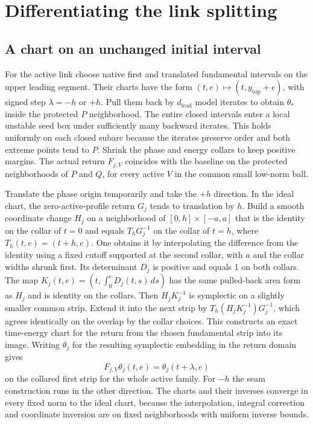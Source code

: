 \documentclass[11pt]{article}
\begin{document}
\section{Differentiating the link splitting}\label{sec:splitting}

\subsection{A chart on an unchanged initial
interval}\label{a-chart-on-an-unchanged-initial-interval}

For the active link choose native first and translated
fundamental intervals on the upper leading segment. Their charts have
the form \((t,e)\mapsto(t,y_{\mathrm{top}}+e)\), with signed step
\(\lambda=-h\) or \(+h\). Pull them back by \(d_{\mathrm{lead}}\) model
iterates to obtain \(\theta_*\) inside the protected \(P\) neighborhood.
The entire closed intervals enter a local unstable seed box under
sufficiently many backward iterates. This holds uniformly on each
closed subarc because the iterates preserve order and both extreme
points tend to \(P\). Shrink the phase and energy collars to keep
positive margins. The actual return \(F_{j,V}\) coincides with the
baseline on the protected neighborhoods of \(P\) and \(Q\), for every
active \(V\) in the common small low-norm ball.

Translate the phase origin temporarily and take the \(+h\) direction. In the ideal chart, the
zero-active-profile return \(G_j\) tends to translation by \(h\). Build a smooth
coordinate change \(H_j\) on a neighborhood of \([0,h]\times[-a,a]\) that is the
identity on the collar of \(t=0\) and equals \(T_h G_j^{-1}\) on the collar of
\(t=h\), where \(T_h(t,e)=(t+h,e)\). One obtains it by interpolating the
difference from the identity using a fixed cutoff supported at the second
collar, with \(a\) and the collar widths shrunk first. Its determinant \(D_j\)
is positive and equals 1 on both collars. The map
\(K_j(t,e)=(t,\int_0^e D_j(t,s)\,ds)\) has the same pulled-back area form as
\(H_j\) and is identity on the collars. Then \(H_j K_j^{-1}\) is symplectic on a
slightly smaller common strip. Extend it into the next strip by
\(T_h(H_jK_j^{-1})G_j^{-1}\), which agrees identically on the overlap by the
collar choices. This constructs an exact time-energy chart for the return from the chosen fundamental strip into its image.
Writing \(\theta_j\) for the resulting symplectic embedding in the
return domain gives
\[
 F_{j,V}\theta_j(t,e)=\theta_j(t+\lambda,e)
\]
on the collared first strip for the whole active family. For \(-h\) the seam construction
runs in the other direction. The charts and their inverses converge in every
fixed norm to the ideal chart, because the interpolation, integral correction
and coordinate inversion are on fixed neighborhoods with uniform inverse bounds.
\end{document}
